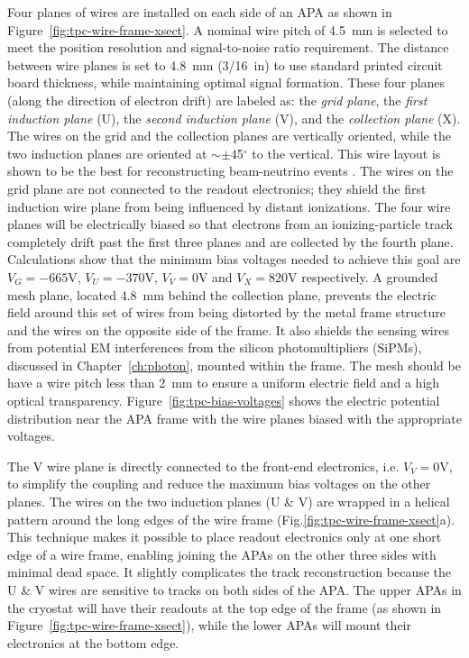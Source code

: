 Four planes of wires are installed on each side of an APA as shown in Figure~\ref{fig:tpc-wire-frame-xsect}.
A nominal wire pitch of 4.5~mm is selected to meet the position resolution  and signal-to-noise ratio requirement. The distance between wire planes is set to 4.8~mm (3/16~in) to use standard printed circuit board thickness, while maintaining optimal signal formation.  These four planes (along the direction of electron drift) are labeled as: the {\em grid plane}, the {\em first induction plane} (U), the {\em second induction plane} (V), and the {\em collection plane} (X).
The wires on the grid and the collection planes
are vertically oriented, while the two induction planes are oriented 
at $\sim\pm$45$^\circ$ to the vertical. This wire layout is shown to be the best for reconstructing beam-neutrino events \cite{wire-orientation}. The wires on the grid plane are not 
connected to the readout electronics; they shield the first induction wire plane from being influenced by distant ionizations. The four wire planes 
will be electrically biased so that electrons from an ionizing-particle
track completely drift past the first three planes and are collected by the 
fourth plane. Calculations show that the minimum bias voltages 
needed to achieve this goal are $V_G= -665$V, $V_U=-370$V, $V_V=0$V and $V_X=820$V 
respectively.  A grounded mesh plane, located 4.8~mm behind the collection plane, prevents the electric field around this set of wires from being distorted by the metal frame structure and the wires on the opposite side of the frame. It also shields the sensing wires from potential EM interferences from the silicon photomultipliers (SiPMs), discussed in Chapter~\ref{ch:photon}, mounted within the frame.  The mesh should be have a wire pitch less than 2~mm to ensure a uniform electric field and a high optical transparency.  Figure~\ref{fig:tpc-bias-voltages} shows the electric potential distribution near the APA frame with the wire planes biased with the appropriate voltages. 

The V wire plane is directly connected to the front-end electronics, i.e. $V_V=0$V, to simplify the coupling and 
reduce the maximum bias voltages on the other planes. The wires on the two induction planes (U \& V) are wrapped in a helical pattern around the long edges of the wire frame 
(Fig.\ref{fig:tpc-wire-frame-xsect}a). This technique makes it possible to place readout 
electronics only at one short edge of a wire frame, enabling joining the APAs on the other three sides with minimal dead space.  It slightly complicates 
the track reconstruction because the U \& V wires are sensitive to tracks on 
both sides of the APA.  The upper APAs in the cryostat will have their readouts
at the top edge of the frame (as shown in Figure~\ref{fig:tpc-wire-frame-xsect}), 
while the lower APAs will mount their electronics at the bottom edge. 

